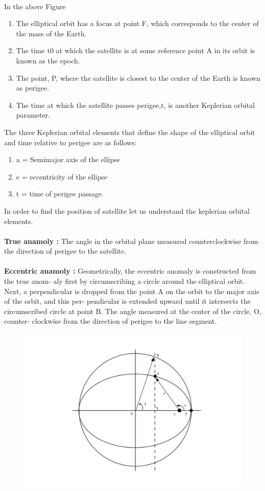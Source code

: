 \vspace{30cm}
\\
In the above Figure 
\begin{enumerate}
\item The elliptical orbit has a focus at point
F, which corresponds to the center of the mass of the Earth.
\item The time t0 at which the satellite is at some
reference point A in its orbit is known as the epoch.
\item The point, P, where the satellite is closest to the center of the Earth
is known as perigee.
\item The time at which the satellite passes perigee,t, is another
Keplerian orbital parameter.
\end{enumerate}
\vspace{5mm}
The three Keplerian orbital elements
that define the shape of the elliptical orbit and time relative to perigee are as
follows:
\begin{enumerate}
  \item a = Semimajor axis of the ellipse
  \item e = eccentricity of the ellipse
  \item t = time of perigee passage
\end{enumerate}
In order to find the position of satellite let us understand the keplerian orbital elements.\\
\\
\textbf{True anamoly :} The angle in the orbital plane measured counterclockwise from
the direction of perigee to the satellite.\\ 
\\
\textbf{Eccentric anamoly :} Geometrically, the eccentric anomaly is constructed from the true anom-
aly first by circumscribing a circle around the elliptical orbit. Next, a perpendicular
is dropped from the point A on the orbit to the major axis of the orbit, and this per-
pendicular is extended upward until it intersects the circumscribed circle at point B. The angle measured at the center of the circle, O, counter-
clockwise from the direction of perigee to the line segment.
\begin{figure}
  \includegraphics[scale=0.4]{figs/2.pdf}
  \end{figure}
